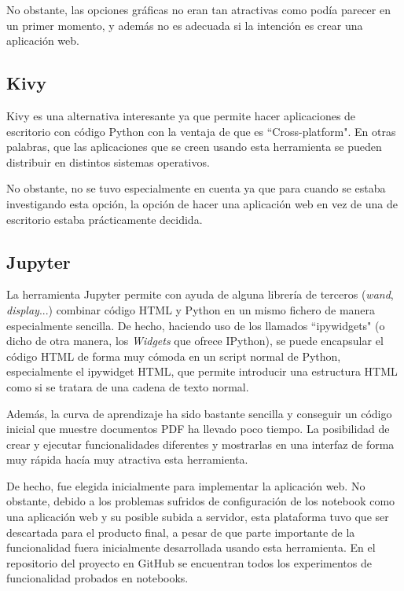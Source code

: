 No obstante, las opciones gráficas no eran tan atractivas como podía parecer en un primer momento, y además no es adecuada si la intención es crear una aplicación web.

\subsection{Kivy}

Kivy \cite{kivy:homepage} es una alternativa interesante ya que permite hacer aplicaciones de escritorio con código Python con la ventaja de que es ``Cross-platform". En otras palabras, que las aplicaciones que se creen usando esta herramienta se pueden distribuir en distintos sistemas operativos. 

No obstante, no se tuvo especialmente en cuenta ya que para cuando se estaba investigando esta opción, la opción de hacer una aplicación web en vez de una de escritorio estaba prácticamente decidida.


\subsection{Jupyter}

La herramienta Jupyter \cite{PER-GRA:2007} permite con ayuda de alguna librería de terceros (\emph{wand}, \emph{display}...) combinar código HTML y Python en un mismo fichero de manera especialmente sencilla. De hecho, haciendo uso de los llamados ``ipywidgets" (o dicho de otra manera, los \emph{Widgets} que ofrece IPython), se puede encapsular el código HTML de forma muy cómoda en un script normal de Python, especialmente el ipywidget HTML, que permite introducir una estructura HTML como si se tratara de una cadena de texto normal.

Además, la curva de aprendizaje ha sido bastante sencilla y conseguir un código inicial que muestre documentos PDF ha llevado poco tiempo. La posibilidad de crear y ejecutar funcionalidades diferentes y mostrarlas en una interfaz de forma muy rápida hacía muy atractiva esta herramienta.

De hecho, fue elegida inicialmente para implementar la aplicación web. No obstante, debido a los problemas sufridos de configuración de los notebook como una aplicación web y su posible subida a servidor, esta plataforma tuvo que ser descartada para el producto final, a pesar de que parte importante de la funcionalidad fuera inicialmente desarrollada usando esta herramienta. En el repositorio del proyecto en GitHub se encuentran todos los experimentos de funcionalidad probados en notebooks.

